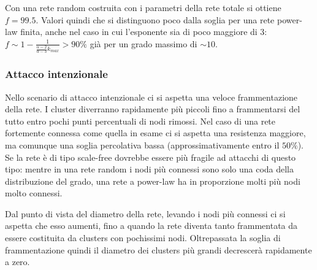 Con una rete random costruita con i parametri della rete totale si ottiene $f = 99.5$. Valori quindi che si distinguono poco dalla soglia per una rete power-law finita, anche nel caso in cui l'esponente sia di poco maggiore di 3: $f \sim 1 - \frac{1}{\frac{\alpha - 2}{\alpha-3}k_{max}} > 90\%$ già per un grado massimo di $\sim10$.


\subsubsection{Attacco intenzionale}
Nello scenario di attacco intenzionale ci si aspetta una veloce frammentazione della rete. I cluster diverranno rapidamente più piccoli fino a frammentarsi del tutto entro pochi punti percentuali di nodi rimossi. Nel caso di una rete fortemente connessa come quella in esame ci si aspetta una resistenza maggiore, ma comunque una soglia percolativa bassa (approssimativamente entro il $50\%$). Se la rete è di tipo scale-free dovrebbe essere più fragile ad attacchi di questo tipo: mentre in una rete random i nodi più connessi sono solo una coda della distribuzione del grado, una rete a power-law ha in proporzione molti più nodi molto connessi.

Dal punto di vista del diametro della rete, levando i nodi più connessi ci si aspetta che esso aumenti, fino a quando la rete diventa tanto frammentata da essere costituita da clusters con pochissimi nodi. Oltrepassata la soglia di frammentazione quindi il diametro dei clusters più grandi decrescerà rapidamente a zero.

